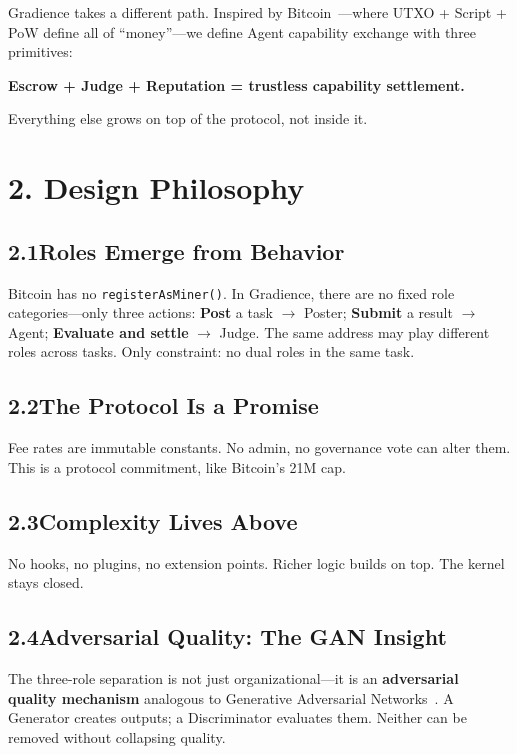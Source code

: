 \documentclass[11pt,a4paper]{article}
\begin{document}
Gradience takes a different path. Inspired by Bitcoin~\cite{bitcoin}---where UTXO + Script + PoW define all of ``money''---we define Agent capability exchange with three primitives:

\begin{center}\textbf{Escrow + Judge + Reputation = trustless capability settlement.}\end{center}

Everything else grows on top of the protocol, not inside it.

\section{2. Design Philosophy}

\subsection{2.1\quad Roles Emerge from Behavior}
Bitcoin has no \texttt{registerAsMiner()}. In Gradience, there are no fixed role categories---only three actions: \textbf{Post} a task $\rightarrow$ Poster; \textbf{Submit} a result $\rightarrow$ Agent; \textbf{Evaluate and settle} $\rightarrow$ Judge. The same address may play different roles across tasks. Only constraint: no dual roles in the same task.

\subsection{2.2\quad The Protocol Is a Promise}
Fee rates are immutable constants. No admin, no governance vote can alter them. This is a protocol commitment, like Bitcoin's 21M cap.

\subsection{2.3\quad Complexity Lives Above}
No hooks, no plugins, no extension points. Richer logic builds on top. The kernel stays closed.

\subsection{2.4\quad Adversarial Quality: The GAN Insight}
The three-role separation is not just organizational---it is an \textbf{adversarial quality mechanism} analogous to Generative Adversarial Networks~\cite{gan}. A Generator creates outputs; a Discriminator evaluates them. Neither can be removed without collapsing quality.
\end{document}
